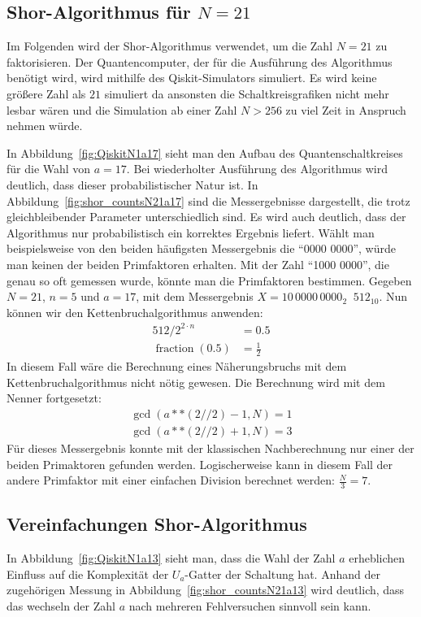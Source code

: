 \documentclass[a4paper,journal]{IEEEtran}
\DeclareMathOperator{\fraction}{fraction}
\DeclareMathOperator{\eqq}{\widehat{=}}
\begin{document}
\subsection{Shor-Algorithmus für \(N = 21\)}
Im Folgenden wird der Shor-Algorithmus verwendet,
um die Zahl \(N = 21\) zu faktorisieren.
Der Quantencomputer, der für die Ausführung des Algorithmus benötigt wird,
wird mithilfe des Qiskit-Simulators simuliert.
Es wird keine größere Zahl als \(21\) simuliert
da ansonsten die Schaltkreisgrafiken nicht mehr lesbar wären und
die Simulation ab einer Zahl \(N > 256\) zu viel Zeit in Anspruch nehmen würde.

In Abbildung~\ref{fig:QiskitN1a17} sieht man den Aufbau des Quantenschaltkreises
für die Wahl von \(a = 17\).
Bei wiederholter Ausführung des Algorithmus wird deutlich,
dass dieser probabilistischer Natur ist.
In Abbildung~\ref{fig:shor_countsN21a17} sind die Messergebnisse dargestellt,
die trotz gleichbleibender Parameter unterschiedlich sind.
Es wird auch deutlich, dass der Algorithmus nur probabilistisch ein korrektes Ergebnis liefert.
Wählt man beispielsweise von den beiden häufigsten Messergebnis die "`0000 0000"',
würde man keinen der beiden Primfaktoren erhalten.
Mit der Zahl "`1000 0000"', die  genau so oft gemessen wurde, könnte man die Primfaktoren bestimmen.
Gegeben \(N = 21\), \(n = 5\) und \(a = 17 \),
mit dem Messergebnis \(X=10\,0000\,0000_2 \eqq 512_{10}\).
Nun können wir den Kettenbruchalgorithmus anwenden:
\begin{align*}
  512/2^{2\cdot n} &= 0.5\\
  \fraction(0.5)   &= \frac{1}{2}
\end{align*}
In diesem Fall wäre die Berechnung eines Näherungsbruchs mit dem Kettenbruchalgorithmus nicht nötig gewesen.
Die Berechnung wird mit dem Nenner fortgesetzt:
\begin{equation*}
\begin{split}
  \gcd(a**(2//2)-1, N) = 1\\
  \gcd(a**(2//2)+1, N) = 3
\end{split}
\end{equation*}
Für dieses Messergebnis konnte mit der klassischen Nachberechnung
nur einer der beiden Primaktoren gefunden werden.
Logischerweise kann in diesem Fall der andere Primfaktor mit einer einfachen Division berechnet werden:
\(\frac{N}{3} = 7\).

\subsection{Vereinfachungen Shor-Algorithmus}
In Abbildung~\ref{fig:QiskitN1a13} sieht man,
dass die Wahl der Zahl \(a\) erheblichen Einfluss auf die Komplexität der \(U_a\)-Gatter der Schaltung hat.
Anhand der zugehörigen Messung in Abbildung~\ref{fig:shor_countsN21a13} wird deutlich,
dass das wechseln der Zahl \(a\) nach mehreren Fehlversuchen sinnvoll sein kann.
\end{document}
